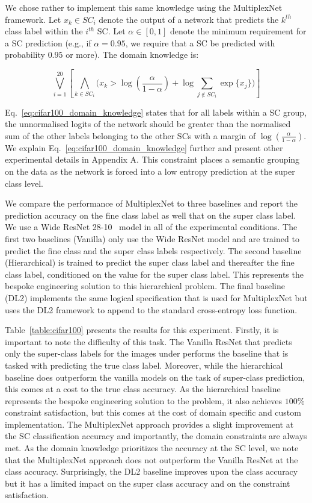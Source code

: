 \documentclass[letterpaper]{article} %
\begin{document}
We chose rather to implement this same knowledge using the MultiplexNet framework.
Let $x_{k} \in SC_i$ denote the output of a network that predicts the $k^{th}$ class label within the $i^{th}$ SC.
Let $\alpha \in [0, 1]$ denote the minimum requirement for a SC prediction (e.g., if  $\alpha = 0.95$, we require that a SC be predicted with probability $0.95$ or more).
The domain knowledge is:

\begin{equation}
    \label{eq:cifar100_domain_knowledge}
    \bigvee_{i=1}^{20} \left[ \bigwedge_{k \in SC_i} \Big( x_{k} > \log(\frac{\alpha}{1-\alpha}) + \log \sum\limits_{j \notin SC_i} \exp \{ x_j \} \Big) \right]
\end{equation}

Eq.~\ref{eq:cifar100_domain_knowledge} states that for all labels within a SC group, the unnormalised logits of the network should be greater than the normalised sum of the other labels belonging to the other SCs with a margin of $\log(\frac{\alpha}{1-\alpha})$.
We explain Eq.~\ref{eq:cifar100_domain_knowledge} further and present other experimental details in Appendix A.
This constraint places a semantic grouping on the data as the network is forced into a low entropy prediction at the super class level.

We compare the performance of MultiplexNet to three baselines and report the prediction accuracy on the fine class label as well that on the super class label.
We use a Wide ResNet 28-10~\citep{zagoruyko2016wide} model in all of the experimental conditions.
The first two baselines (Vanilla) only use the Wide ResNet model and are trained to predict the fine class and the super class labels respectively.
The second baseline (Hierarchical) is trained to predict the super class label and thereafter the fine class label, conditioned on the value for the super class label.
This represents the bespoke engineering solution to this hierarchical problem.
The final baseline (DL2) implements the same logical specification that is used for MultiplexNet but uses the DL2 framework to append to the standard cross-entropy loss function.

Table~\ref{table:cifar100} presents the results for this experiment.
Firstly, it is important to note the difficulty of this task.
The Vanilla ResNet that predicts only the super-class labels for the images under performs the baseline that is tasked with predicting the true class label.
Moreover, while the hierarchical baseline does outperform the vanilla models on the task of super-class prediction, this comes at a cost to the true class accuracy.
As the hierarchical baseline represents the bespoke engineering solution to the problem, it also achieves $100\%$ constraint satisfaction, but this comes at the cost of domain specific and custom implementation.
The MultiplexNet approach provides a slight improvement at the SC classification accuracy and importantly, the domain constraints are always met.
As the domain knowledge prioritizes the accuracy at the SC level, we note that the MultiplexNet approach does not outperform the Vanilla ResNet at the class accuracy.
Surprisingly, the DL2 baseline improves upon the class accuracy but it has a limited impact on the super class accuracy and on the constraint satisfaction.
\end{document}
